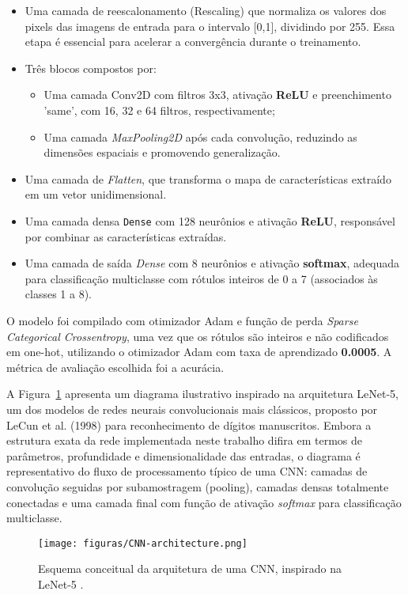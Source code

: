\begin{itemize}
\item Uma camada de reescalonamento (Rescaling) que normaliza os valores dos pixels das imagens de entrada para o intervalo
[0,1], dividindo por 255. Essa etapa é essencial para acelerar a convergência durante o treinamento.
\item Três blocos compostos por:
    \begin{itemize}
        \item Uma camada Conv2D com filtros 3x3, ativação \textbf{ReLU} e preenchimento 'same', com 16, 32 e 64 filtros, respectivamente; 
        \item Uma camada \textit{MaxPooling2D} após cada convolução, reduzindo as dimensões espaciais e promovendo generalização.
    \end{itemize}
\item Uma camada de \textit{Flatten}, que transforma o mapa de características extraído em um vetor unidimensional.
\item Uma camada densa \texttt{Dense}  com 128 neurônios e ativação \textbf{ReLU}, responsável por combinar as características extraídas.
\item Uma camada de saída \textit{Dense} com 8 neurônios e ativação \textbf{softmax}, adequada para classificação multiclasse com rótulos 
inteiros de 0 a 7 (associados às classes 1 a 8).
\end{itemize}

O modelo foi compilado com otimizador Adam e função de perda \textit{Sparse Categorical Crossentropy}, uma vez que os rótulos são 
inteiros e não codificados em one-hot, utilizando o otimizador Adam com taxa de aprendizado \textbf{0.0005}. A métrica de avaliação 
escolhida foi a acurácia.

A Figura~\ref{fig:modelo-cnn} apresenta um diagrama ilustrativo inspirado na arquitetura LeNet-5, 
um dos modelos de redes neurais convolucionais mais clássicos, proposto por LeCun et al. (1998) para 
reconhecimento de dígitos manuscritos. Embora a estrutura exata da rede implementada neste trabalho difira em 
termos de parâmetros, profundidade e dimensionalidade das entradas, o diagrama é representativo do fluxo de 
processamento típico de uma CNN: camadas de convolução seguidas por subamostragem (pooling), camadas densas 
totalmente conectadas e uma camada final com função de ativação \textit{softmax} para classificação multiclasse.

\begin{figure}[H]
    \centering
    \texttt{[image: figuras/CNN-architecture.png]}
    \caption{Esquema conceitual da arquitetura de uma CNN, inspirado na LeNet-5 \cite{lecun1998gradient}.}
    \label{fig:modelo-cnn}
\end{figure}

